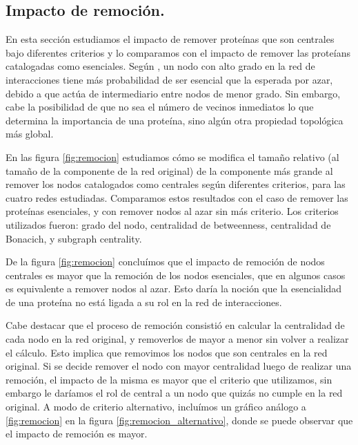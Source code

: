 
\subsection{Impacto de remoción.}

\par En esta sección estudiamos el impacto de remover proteínas que son centrales bajo diferentes criterios y lo comparamos con el impacto de remover las proteíans catalogadas como esenciales. Según \cite{jeong2000}, un nodo con alto grado en la red de interacciones tiene más probabilidad de ser esencial que la esperada por azar, debido a que actúa de intermediario entre nodos de menor grado. Sin embargo, cabe la posibilidad de que no sea el número de vecinos inmediatos lo que determina la importancia de una proteína, sino algún otra propiedad topológica más global.
\par En las figura \ref{fig:remocion} estudiamos cómo se modifica el tamaño relativo (al tamaño de la componente de la red original) de la componente más grande al remover los nodos catalogados como centrales según diferentes criterios, para las cuatro redes estudiadas. Comparamos estos resultados con el caso de remover las proteínas esenciales, y con remover nodos al azar sin más criterio. Los criterios utilizados fueron: grado del nodo, centralidad de betweenness, centralidad de Bonacich, y subgraph centrality. 
\par De la figura \ref{fig:remocion} concluímos que el impacto de remoción de nodos centrales es mayor que la remoción de los nodos esenciales, que en algunos casos es equivalente a remover nodos al azar. Esto daría la noción que la esencialidad de una proteína no está ligada a su rol en la red de interacciones.
\par Cabe destacar que el proceso de remoción consistió en calcular la centralidad de cada nodo en la red original, y removerlos de mayor a menor sin volver a realizar el cálculo. Esto implica que removimos los nodos que son centrales en la red original. Si se decide remover el nodo con mayor centralidad luego de realizar una remoción, el impacto de la misma es mayor que el criterio que utilizamos, sin embargo le daríamos el rol de central a un nodo que quizás no cumple en la red original. A modo de criterio alternativo, incluímos un gráfico análogo a \ref{fig:remocion} en la figura \ref{fig:remocion_alternativo}, donde se puede observar que el impacto de remoción es mayor.
 
